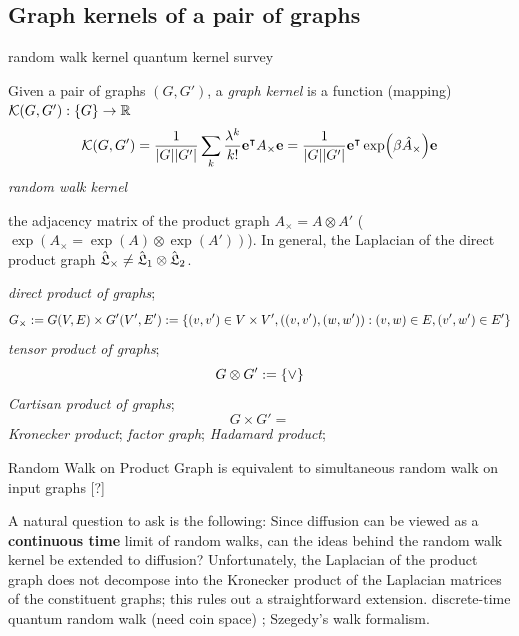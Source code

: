 \subsection{Graph kernels of a pair of graphs}
random walk kernel
\cite{vishwanathanGraphKernels2010}
quantum kernel
\cite{baiQuantumJensenShannon2015}
survey
\cite{kriegeSurveyGraphKernels2020}
\begin{definition}\label{def:graph_kernel}
	Given a pair of graphs $(G,G')$,
	a \emph{graph kernel} is a function (mapping)
	$\mathcal{K}(G,G'): \qty{ G} \to \mathbb{R}$
	\begin{equation}
		\mathcal{K}(G,G') =
		\frac{1}{\abs{G}\abs{G'}}
		\sum_k \frac{\lambda^k}{k!} \vb{e}^\intercal A_{\times} \vb{e}
		=\frac{1}{\abs{G}\abs{G'}}
		\vb{e}^\intercal \exp(\beta \hat{A}_{\times}) \vb{e}
	\end{equation}
	\emph{random walk kernel}
\end{definition}
\begin{remark}
	the adjacency matrix of the product graph $A_{\times}=A\otimes A'$ ($\exp(A_{\times}=\exp(A)\otimes \exp(A'))$).	
	In general, the Laplacian of the direct product graph 
	$\hat{\mathfrak{L}}_{\times}\neq \hat{\mathfrak{L}}_1\otimes \hat{\mathfrak{L}}_2$.
\end{remark}
\cite{chungSpectralGraphTheory1997}
\begin{definition}\label{def:product_graphs}
	\emph{direct product of graphs};
	\begin{equation}
		G_{\times} : =
		G(V,E)\times G'(V',E') 
		: = \qty{(v,v')\in V\times V',((v,v'),(w,w')): (v,w)\in E, (v',w')\in E'}
	\end{equation}
	\emph{tensor product of graphs};
	\begin{equation}
		G\otimes G' := \qty{ \vee }
	\end{equation}
	\emph{Cartisan product of graphs};
	\begin{equation}
		G\times G' = \qty{}
	\end{equation}
	\emph{Kronecker product};
	\emph{factor graph};
	\emph{Hadamard product};
\end{definition}
\begin{remark}
	Random Walk on Product Graph is equivalent to simultaneous random walk on input graphs [?]
\end{remark}
\begin{remark}
	A natural question to ask is the following: Since diffusion can be viewed as a \textbf{continuous time} limit of random walks, can the ideas behind the random walk kernel be extended to diffusion? Unfortunately, the Laplacian of the product graph does not decompose into the Kronecker product of the Laplacian matrices of the constituent graphs; this rules out a straightforward extension.
	discrete-time quantum random walk (need coin space) \cite{ambainisCoinsMakeQuantum2005} \cite{childsQuantumInformationProcessing2004};
	Szegedy's walk formalism.
	\cite{szegedySpectraQuantizedWalks2004}
\end{remark}
